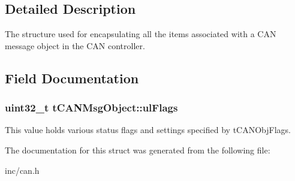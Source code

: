 \subsection{Detailed Description}
The structure used for encapsulating all the items associated with a C\+AN message object in the C\+AN controller. 

\subsection{Field Documentation}
\subsubsection[{\texorpdfstring{ul\+Flags}{ulFlags}}]{\setlength{\rightskip}{0pt plus 5cm}uint32\+\_\+t t\+C\+A\+N\+Msg\+Object\+::ul\+Flags}\hypertarget{structtCANMsgObject_a23801a4be509591978e7b4f9bcafe124}{}\label{structtCANMsgObject_a23801a4be509591978e7b4f9bcafe124}
This value holds various status flags and settings specified by t\+C\+A\+N\+Obj\+Flags. 

The documentation for this struct was generated from the following file\+:\begin{DoxyCompactItemize}
\item 
inc/can.\+h\end{DoxyCompactItemize}
